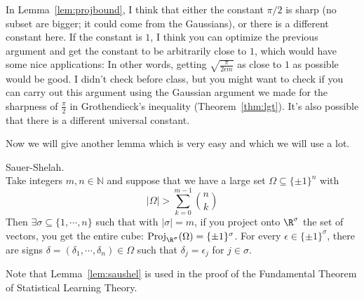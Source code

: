 \begin{rem}
In Lemma~\ref{lem:projbound}, I think that either the constant $\pi/2$ is sharp (no subset are bigger; it could come from the Gaussians), or there is a different constant here. If the constant is $1$, I think you can optimize the previous argument and get the constant to be arbitrarily close to $1$, which would have some nice applications: In other words, getting $\sqrt{\frac{\pi}{2\epsilon m}}$ as close to $1$ as possible would be good. I didn't check before class, but you might want to check if you can carry out this argument using the Gaussian argument we made for the sharpness of $\frac{\pi}{2}$ in Grothendieck's inequality (Theorem~\ref{thm:lgt}). It's also possible that there is a different universal constant. 
\end{rem}

Now we will give another lemma which is very easy and which we will use a lot. 
\begin{lem} Sauer-Shelah.  \\
Take integers $m, n \in \mathbb{N}$ and suppose that we have a large set $\Omega \subseteq \{\pm 1\}^n$ with 
\[
|\Omega| > \sum_{k = 0}^{m - 1} {n \choose k}
\]
Then $\exists \sigma \subseteq \{1, \cdots, n\}$ such that with $|\sigma| = m$, if you project onto $\R^{\sigma}$ the set of vectors, you get the entire cube: $\text{Proj}_{\R^{\sigma}}(\Omega) = \{\pm 1\}^{\sigma}$. For every $\epsilon \in \{\pm 1\}^{\sigma}$, there are signs $\delta = (\delta_1, \cdots, \delta_n) \in \Omega$ such that $\delta_j = \epsilon_j$ for $j \in \sigma$.
\end{lem}

Note that Lemma~\ref{lem:saushel} is used in the proof of the Fundamental Theorem of Statistical Learning Theory. 

